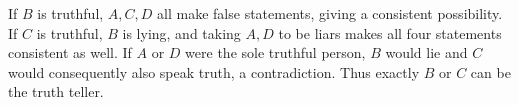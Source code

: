 If $B$ is truthful, $A,C,D$ all make false statements, giving a consistent possibility. If $C$ is truthful, $B$ is lying, and taking $A,D$ to be liars makes all four statements consistent as well. If $A$ or $D$ were the sole truthful person, $B$ would lie and $C$ would consequently also speak truth, a contradiction. Thus exactly $\boxed{B\text{ or }C}$ can be the truth teller.
